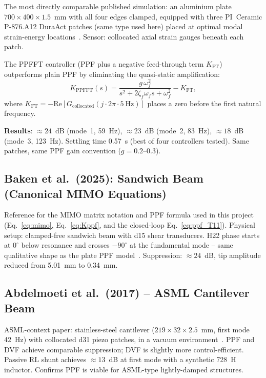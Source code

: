 \documentclass[12pt,a4paper]{article}
\begin{document}
The most directly comparable published simulation: an aluminium plate
$700 \times 400 \times 1.5$~mm with all four edges clamped, equipped with three
PI~Ceramic P-876.A12 DuraAct patches (same type used here) placed at optimal
modal strain-energy locations~\cite{luleci2013}.  Sensor: collocated axial strain
gauges beneath each patch.

The PPFFT controller (PPF plus a negative feed-through term $K_\text{FT}$)
outperforms plain PPF by eliminating the quasi-static amplification:
\begin{equation}
  K_\text{PPFFT}(s) = \frac{g\,\omega_f^2}{s^2 + 2\zeta_f\omega_f s + \omega_f^2}
                       - K_\text{FT},
\end{equation}
where $K_\text{FT} = -\mathrm{Re}[G_\text{collocated}(j \cdot 2\pi \cdot 5\ \text{Hz})]$
places a zero before the first natural frequency.

\textbf{Results}: $\approx 24$~dB (mode~1, 59~Hz), $\approx 23$~dB (mode~2, 83~Hz),
$\approx 18$~dB (mode~3, 123~Hz).  Settling time 0.57~s (best of four controllers
tested).  Same patches, same PPF gain convention ($g = 0.2$--$0.3$).

\subsection*{Baken et al.\ (2025): Sandwich Beam (Canonical MIMO Equations)}

Reference for the MIMO matrix notation and PPF formula used in this project
(Eq.~\eqref{eq:mimo}, Eq.~\eqref{eq:Kppf}, and the closed-loop
Eq.~\eqref{eq:ppf_T11}).  Physical setup: clamped-free sandwich beam with d15
shear transducers.  H22 phase starts at $0^\circ$ below resonance and crosses
$-90^\circ$ at the fundamental mode -- same qualitative shape as the plate PPF
model~\cite{baken2025}.  Suppression: $\approx 24$~dB, tip amplitude reduced from
5.01~mm to 0.34~mm.

\subsection*{Abdelmoeti et al.\ (2017) -- ASML Cantilever Beam}

ASML-context paper: stainless-steel cantilever ($219 \times 32 \times 2.5$~mm,
first mode 42~Hz) with collocated d31 piezo patches, in a vacuum environment~\cite{abdelmoeti2017}.
PPF and DVF achieve comparable suppression; DVF is slightly more control-efficient.
Passive RL shunt achieves $\approx 13$~dB at first mode with a synthetic 728~H
inductor.  Confirms PPF is viable for ASML-type lightly-damped structures.
\end{document}

